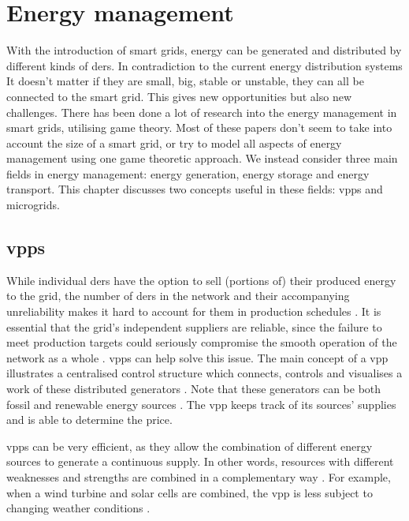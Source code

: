 \section{Energy management}\label{em}
With the introduction of smart grids, energy can be generated and distributed by different kinds of \acp{der}. In contradiction to the current energy distribution systems It doesn't matter if they are small, big, stable or unstable, they can all be connected to the smart grid.  This gives new opportunities but also new challenges.
There has been done a lot of research into the energy management in smart grids, utilising game theory\cite{WangOuyangKrishnanEtAl2015, TusharZhangSmithEtAl2013}. Most of these papers don't seem to take into account the size of a smart grid, or try to model all aspects of energy management using one game theoretic approach. We instead consider three main fields in energy management: energy generation, energy storage and energy transport. This chapter discusses two concepts useful in these fields: \acp{vpp} and microgrids. 

\subsection{\aclp{vpp}}
While individual \acp{der} have the option to sell (portions of) their produced energy to the grid, the number of \acp{der} in the network and their accompanying unreliability makes it hard to account for them in production schedules \cite{RobuKotaChalkiadakisEtAl2012}. It is essential that the grid's independent suppliers are reliable, since the failure to meet production targets could seriously compromise the smooth operation of the network as a whole \cite{ChalkiadakisRobuKotaEtAl2011}. \acp{vpp} can help solve this issue. The main concept of a \ac{vpp} illustrates a centralised control structure which connects, controls and visualises a work of these distributed generators \cite{NikonowiczMilewski2012}. Note that these generators can be both fossil and renewable energy sources \cite{LombardiPowalkoRudion2009}. The \ac{vpp} keeps track of its sources' supplies and is able to determine the price. 

\acp{vpp} can be very efficient, as they allow the combination of different energy sources to generate a continuous supply. In other words, resources with different weaknesses and strengths are combined in a complementary way \cite{Koeppel2003}. For example, when a wind turbine and solar cells are combined, the \ac{vpp} is less subject to changing weather conditions \cite{Tromly2001, Kumagai2012, MashhourMoghaddas-Tafreshi2011, NikonowiczMilewski2012}. 

